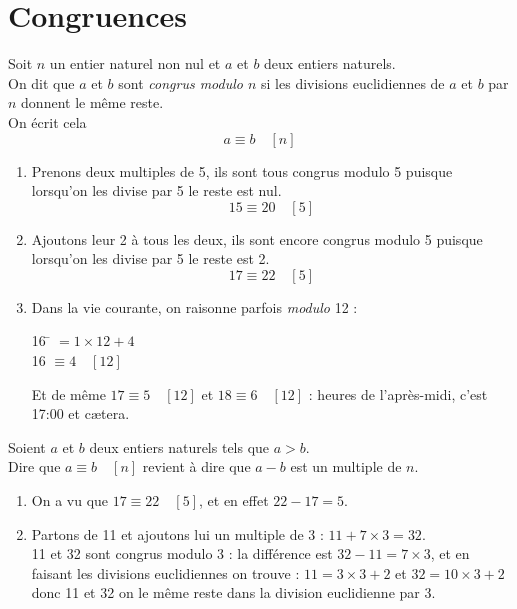 \documentclass[a4paper,12pt,french]{book}
\begin{document}
\section{Congruences}

\begin{definition}[]
	Soit $n$ un entier naturel non nul et $a$ et $b$ deux entiers naturels.\\
	On dit que $a$ et $b$ sont \textit{congrus modulo $n$} si les divisions euclidiennes de $a$ et $b$ par $n$ donnent le même reste.\\
	On écrit cela $$a\equiv b\quad [n]$$
\end{definition}
\begin{exemple}[]
	\begin{enumerate}[\bfseries a.]
		\item 	Prenons deux multiples de 5, ils sont tous congrus modulo 5 puisque lorsqu'on les divise par 5 le reste est nul.\\
				$$15\equiv 20\quad[5]$$
		\item 	Ajoutons leur 2 à tous les deux, ils sont encore congrus modulo 5 puisque lorsqu'on les divise par 5 le reste est 2.
				$$17\equiv 22\quad[5]$$
		\item 	Dans la vie courante, on raisonne parfois \textit{modulo} 12 :
				\begin{tabbing}
					16 \= $=1\times 12 +4$\\
					16	\>$\equiv 4 \quad[12]$ 
				\end{tabbing}
				Et de même $17\equiv 5 \quad[12]$ et $18\equiv 6 \quad[12]$ : 	 heures de l'après-midi, c'est 17:00\fg{} et c\ae tera.
	\end{enumerate}
\end{exemple}
\begin{propriete}[]
	Soient $a$ et $b$ deux entiers naturels tels que $a>b$.\\
	Dire que $a\equiv b\quad[n]$ revient à dire que $a-b$ est un multiple de $n$.
\end{propriete}
\begin{exemple}[s]
	\begin{enumerate}[\bfseries a.]
		\item 	On a vu que $17\equiv 22\quad[5]$, et en effet $22-17=5$.
		\item 	Partons de 11 et ajoutons lui un multiple de 3 : $11+7\times 3 = 32$.\\
				11 et 32 sont congrus modulo 3 : la différence est $32-11=7\times 3$, et en faisant les divisions euclidiennes on trouve :
				$11=3\times 3 +2$ et $32=10\times 3+2$ donc 11 et 32 on le même reste dans la division euclidienne par 3.
	\end{enumerate}
\end{exemple}
\end{document}
